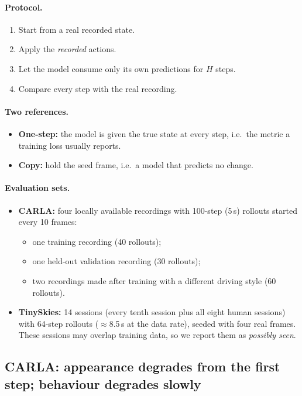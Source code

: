 \documentclass[11pt]{article}
\begin{document}
\paragraph{Protocol.}
\begin{enumerate}
  \item Start from a real recorded state.
  \item Apply the \emph{recorded} actions.
  \item Let the model consume only its own predictions for $H$ steps.
  \item Compare every step with the real recording.
\end{enumerate}

\paragraph{Two references.}
\begin{itemize}
  \item \textbf{One-step:} the model is given the true state at every step, i.e.\ the metric a training loss usually reports.
  \item \textbf{Copy:} hold the seed frame, i.e.\ a model that predicts no change.
\end{itemize}

\paragraph{Evaluation sets.}
\begin{itemize}
  \item \textbf{CARLA:} four locally available recordings with 100-step (5\,s) rollouts started every 10 frames:
  \begin{itemize}
    \item one training recording (40 rollouts);
    \item one held-out validation recording (30 rollouts);
    \item two recordings made after training with a different driving style (60 rollouts).
  \end{itemize}
  \item \textbf{TinySkies:} 14 sessions (every tenth session plus all eight human sessions) with 64-step rollouts ($\approx$8.5\,s at the data rate), seeded with four real frames. These sessions may overlap training data, so we report them as \emph{possibly seen}.
\end{itemize}

\subsection{CARLA: appearance degrades from the first step; behaviour degrades slowly}
\label{sec:carla-replay}
\end{document}
